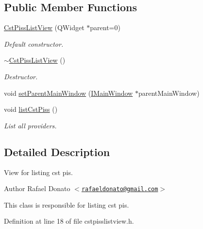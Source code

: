 \subsection*{\-Public \-Member \-Functions}
\begin{DoxyCompactItemize}
\item 
\hyperlink{class_cst_piss_list_view_aabc11ad4dc2f22daf7ddbb41f50abada}{\-Cst\-Piss\-List\-View} (\-Q\-Widget $\ast$parent=0)
\begin{DoxyCompactList}\small\item\em \-Default constructor. \end{DoxyCompactList}\item 
\hyperlink{class_cst_piss_list_view_a60723f4697c812b0784d5407afa74114}{$\sim$\-Cst\-Piss\-List\-View} ()
\begin{DoxyCompactList}\small\item\em \-Destructor. \end{DoxyCompactList}\item 
void \hyperlink{class_cst_piss_list_view_a3e1422a613deef3b1766daa2af873eed}{set\-Parent\-Main\-Window} (\hyperlink{class_i_main_window}{\-I\-Main\-Window} $\ast$parent\-Main\-Window)
\item 
void \hyperlink{class_cst_piss_list_view_adaae5eedf844cbe87f218b48dfbfea9c}{list\-Cst\-Piss} ()
\begin{DoxyCompactList}\small\item\em \-List all providers. \end{DoxyCompactList}\end{DoxyCompactItemize}


\subsection{\-Detailed \-Description}
\-View for listing cst pis. 

\begin{DoxyAuthor}{\-Author}
\-Rafael \-Donato $<$\href{mailto:rafaeldonato@gmail.com}{\tt rafaeldonato@gmail.\-com}$>$
\end{DoxyAuthor}
\-This class is responsible for listing cst pis. 

\-Definition at line 18 of file cstpisslistview.\-h.



